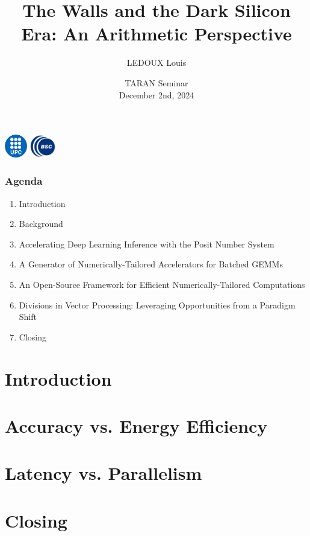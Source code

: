 \documentclass[]{beamer}
\author[TARAN Seminar]{LEDOUX Louis}
\institute[]{Universitat Politècnica de Catalunya (UPC)\\ Barcelona Supercomputing Center (BSC)
\vspace{2mm} \\
}
\title[]{The Walls and the Dark Silicon Era: An Arithmetic Perspective}
\date[December 2nd, 2024]{\small{TARAN Seminar} \\ \small{December 2nd, 2024}}
\begin{document}
\begin{frame}[plain]
	\titlepage
	\begin{center}%
		\vspace{-0.2cm}
		\includegraphics[height=1cm]{./figs/darkblue-logo.pdf}
		\hspace{2mm}
		\includegraphics[height=1cm]{./figs/bsc_logo_2.jpg}
	\end{center}
\end{frame}

\begin{frame}
\frametitle{Agenda}
	\begin{enumerate}
		\item Introduction
		\item Background
		\item Accelerating Deep Learning Inference with the Posit Number System
		\item A Generator of Numerically-Tailored Accelerators for Batched GEMMs
		\item An Open-Source Framework for Efficient Numerically-Tailored Computations
		\item Divisions in Vector Processing: Leveraging Opportunities from a Paradigm Shift
		\item Closing
	\end{enumerate}
\end{frame}

\section{Introduction}
 

\section{Accuracy vs. Energy Efficiency}


\section{Latency vs. Parallelism}

\section{Closing}

\appendix


 
\end{document}
